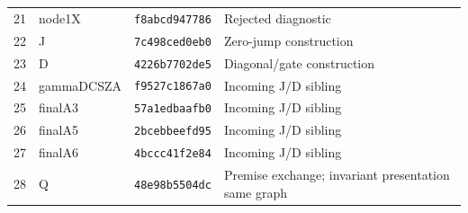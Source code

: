 \begin{longtable}{rlp{.21\linewidth}p{.40\linewidth}}
21 & node1X & \texttt{f8abcd947786} & Rejected diagnostic \\
22 & J & \texttt{7c498ced0eb0} & Zero-jump construction \\
23 & D & \texttt{4226b7702de5} & Diagonal/gate construction \\
24 & gammaDCSZA & \texttt{f9527c1867a0} & Incoming J/D sibling \\
25 & finalA3 & \texttt{57a1edbaafb0} & Incoming J/D sibling \\
26 & finalA5 & \texttt{2bcebbeefd95} & Incoming J/D sibling \\
27 & finalA6 & \texttt{4bccc41f2e84} & Incoming J/D sibling \\
28 & Q & \texttt{48e98b5504dc} & Premise exchange; invariant presentation same graph \\
\bottomrule
\end{longtable}
\normalsize

